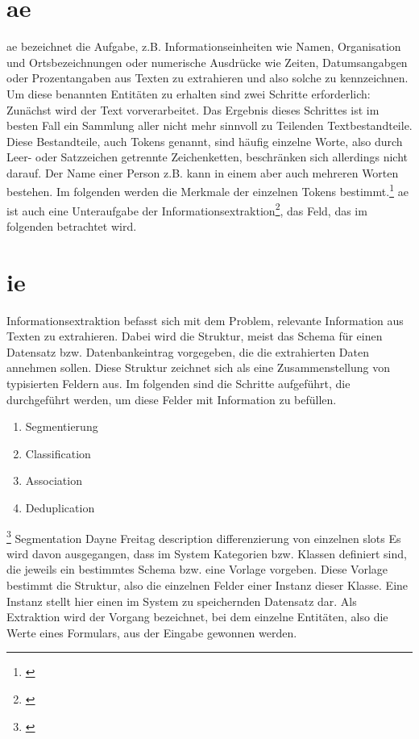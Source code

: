 \section{\Acrlong{ae}}
\gls{ae} bezeichnet die Aufgabe, z.B. Informationseinheiten wie Namen, Organisation und Ortsbezeichnungen oder numerische Ausdrücke wie Zeiten, Datumsangabgen oder Prozentangaben aus Texten zu extrahieren und also solche zu kennzeichnen. Um diese benannten Entitäten zu erhalten sind zwei Schritte erforderlich: Zunächst wird der Text vorverarbeitet. Das Ergebnis dieses Schrittes ist im besten Fall ein Sammlung aller nicht mehr sinnvoll zu Teilenden Textbestandteile. Diese Bestandteile, auch Tokens genannt, sind häufig einzelne Worte, also durch Leer- oder Satzzeichen getrennte Zeichenketten, beschränken sich allerdings nicht darauf. Der Name einer Person z.B. kann in einem aber auch mehreren Worten bestehen. Im folgenden werden die Merkmale der einzelnen Tokens bestimmt.\footnote{\cite{nadeau2007survey}} \gls{ae} ist auch eine Unteraufgabe der Informationsextraktion\footnote{\cite{manning2012information}}, das Feld, das im folgenden betrachtet wird.

\section{\acrlong{ie}}
Informationsextraktion befasst sich mit dem Problem, relevante Information aus Texten zu extrahieren. Dabei wird die Struktur, meist das Schema für einen Datensatz bzw. Datenbankeintrag vorgegeben, die die extrahierten Daten annehmen sollen. Diese Struktur zeichnet sich als eine Zusammenstellung von typisierten Feldern aus. Im folgenden sind die Schritte aufgeführt, die durchgeführt werden, um diese Felder mit Information zu befüllen.
\begin{enumerate}
	\item Segmentierung
	\item Classification
	\item Association
	\item Deduplication
\end{enumerate}
\footnote{\cite{mccallum2005information}}
Segmentation 
Dayne Freitag description
differenzierung von einzelnen slots
Es wird davon ausgegangen, dass im System Kategorien bzw. Klassen definiert sind, die jeweils ein bestimmtes Schema bzw. eine Vorlage vorgeben. Diese Vorlage bestimmt die Struktur, also die einzelnen Felder einer Instanz dieser Klasse. Eine Instanz stellt hier einen im System zu speichernden Datensatz dar. Als Extraktion wird der Vorgang bezeichnet, bei dem einzelne Entitäten, also die Werte eines Formulars, aus der Eingabe gewonnen werden.



